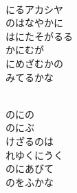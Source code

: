 \documentclass[10pt,b5j]{tarticle} %
\begin{document}
\vspace{1.5em} %
\newcommand{\linespace}{0.5em} %
\newcommand{\blocksize}{0.5\hsize} %
\newcommand{\itemmargin}{3em} %
\begin{enumerate} %
    \setlength{\itemindent}{\itemmargin} %
    \begin{minipage}[c]{\blocksize}
    
        \vspace{\linespace}
        \item~\\
        にるアカシヤ\\
        のはなやかに\\
        はにたそがるる\\
        かにむが\\
        にめざむかの\\
        みてるかな
        
    \end{minipage}
    \begin{minipage}[c]{\blocksize}
        
        \vspace{\linespace}
        \item~\\
        のにの\\
        のにぶ\\
        けざるのは\\
        れゆくにうく\\
        のにあびて\\
        のをふかな
        
    \end{minipage}
    \begin{minipage}[c]{\blocksize}
        

\end{minipage}
\end{enumerate}
\end{document}
